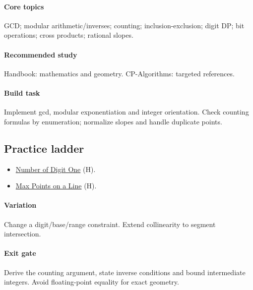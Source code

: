\documentclass[11pt,letterpaper]{article}
\begin{document}
\paragraph*{Core topics}

GCD; modular arithmetic/inverses; counting; inclusion-exclusion; digit DP; bit operations; cross products; rational slopes.

\paragraph*{Recommended study}

Handbook: mathematics and geometry. CP-Algorithms: targeted references.

\paragraph*{Build task}

Implement gcd, modular exponentiation and integer orientation. Check counting formulas by enumeration; normalize slopes and handle duplicate points.

\subsection*{Practice ladder}

\begin{itemize}

\item \href{https://leetcode.com/problems/number-of-digit-one/}{Number of Digit One} (H).

\item \href{https://leetcode.com/problems/max-points-on-a-line/}{Max Points on a Line} (H).

\end{itemize}

\paragraph*{Variation}

Change a digit/base/range constraint. Extend collinearity to segment intersection.

\paragraph*{Exit gate}

Derive the counting argument, state inverse conditions and bound intermediate integers. Avoid floating-point equality for exact geometry.
\end{document}
